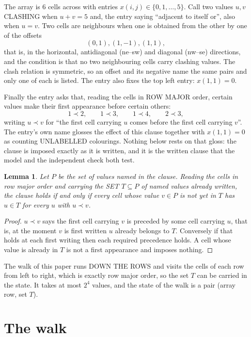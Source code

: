 \documentclass[11pt,a4paper]{article}
\theoremstyle{plain}
\newtheorem{lemma}[theorem]{Lemma}
\theoremstyle{definition}
\begin{document}
The array is $6$ cells across with entries $x(i,j)\in\{0,1,\dots,5\}$. Call two values $u,v$ CLASHING
when $u+v=5$ and, the entry saying ``adjacent to itself or'', also when $u=v$. Two cells are neighbours when one is obtained from the other by one of
the offsets
\[
(0,1), (1,-1), (1,1),
\]
that is, in the horizontal, antidiagonal (ne--sw) and diagonal (nw--se) directions, and the condition is that no two neighbouring cells carry
clashing values. The clash relation is symmetric, so an offset and its negative name the
same pairs and only one of each is listed. The entry also fixes the top left entry: $x(1,1)=0$.

Finally the entry asks that, reading the cells in ROW MAJOR order, certain values make their
first appearance before certain others:
\[
1\prec 2,\qquad 1\prec 3,\qquad 1\prec 4,\qquad 2\prec 3 ,
\]
writing $u\prec v$ for ``the first cell carrying $u$ comes before the first cell carrying
$v$''. The entry's own name glosses the effect of this clause together with $x(1,1)=0$ as
counting UNLABELLED colourings. Nothing below rests on that gloss: the clause is imposed
exactly as it is written, and it is the written clause that the model and the independent
check both test.

\begin{lemma}\label{lem:seen}
Let $P$ be the set of values named in the clause. Reading the cells in row major order and
carrying the SET $T\subseteq P$ of named values already written, the clause holds if and only
if every cell whose value $v\in P$ is not yet in $T$ has $u\in T$ for every $u$ with $u\prec v$.
\end{lemma}

\begin{proof}
$u\prec v$ says the first cell carrying $v$ is preceded by some cell carrying $u$, that is, at
the moment $v$ is first written $u$ already belongs to $T$. Conversely if that holds at each
first writing then each required precedence holds. A cell whose value is already in $T$ is not
a first appearance and imposes nothing.
\end{proof}

The walk of this paper runs DOWN THE ROWS and visits the cells of each row from left to right,
which is exactly row major order, so the set $T$ can be carried in the state. It takes at most
$2^{4}$ values, and the state of the walk is a pair (array row, set $T$).

\section{The walk}
\end{document}
